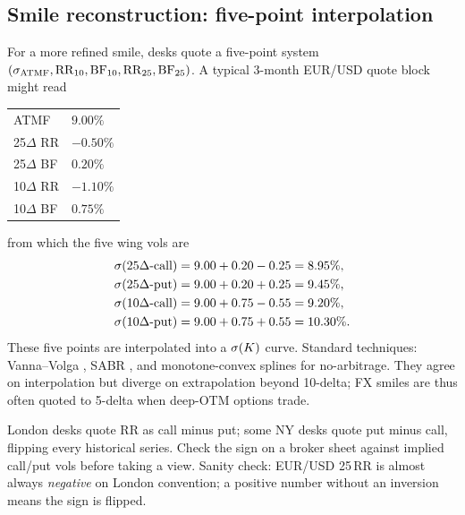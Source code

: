 \subsection{Smile reconstruction: five-point interpolation}
\label{subsec:smile_reconstruction}

For a more refined smile, desks quote a five-point system
$(\sigma_{\mathrm{ATMF}}, \mathrm{RR}_{10}, \mathrm{BF}_{10},
\mathrm{RR}_{25}, \mathrm{BF}_{25})$.  A typical 3-month EUR/USD
quote block might read
\begin{center}
\small
\begin{tabular}{@{}ll@{}}
\toprule
ATMF & $9.00\%$ \\
25$\Delta$ RR & $-0.50\%$ \\
25$\Delta$ BF & $0.20\%$ \\
10$\Delta$ RR & $-1.10\%$ \\
10$\Delta$ BF & $0.75\%$ \\
\bottomrule
\end{tabular}
\end{center}
from which the five wing vols are
\begin{align}
  \sigma(25\Delta\text{-call}) &= 9.00 + 0.20 - 0.25 = 8.95\%, \\
  \sigma(25\Delta\text{-put})  &= 9.00 + 0.20 + 0.25 = 9.45\%, \\
  \sigma(10\Delta\text{-call}) &= 9.00 + 0.75 - 0.55 = 9.20\%, \\
  \sigma(10\Delta\text{-put})  &= 9.00 + 0.75 + 0.55 = 10.30\%.
\end{align}
These five points are interpolated into a $\sigma(K)$ curve.
Standard techniques: Vanna--Volga \citep{castagna2007consistent},
SABR \citep{hagan2002managing}, and monotone-convex splines for
no-arbitrage.  They agree on interpolation but diverge on
extrapolation beyond 10-delta; FX smiles are thus often quoted to
5-delta when deep-OTM options trade.

\begin{pitfallbox}
London desks quote RR as call minus put; some NY desks quote put
minus call, flipping every historical series.  Check the sign on a
broker sheet against implied call/put vols before taking a view.
Sanity check: EUR/USD 25\,RR is almost always \emph{negative} on
London convention; a positive number without an inversion means
the sign is flipped.
\end{pitfallbox}


